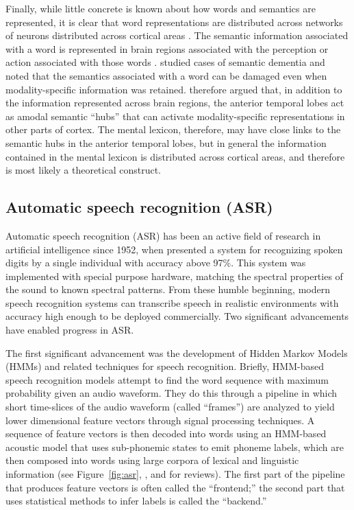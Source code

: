 Finally,
while little concrete is known
about how words and semantics
are represented,
it is clear that word representations
are distributed across networks
of neurons distributed
across cortical areas
\citep{pulvermuller2001}.
The semantic information associated
with a word is represented
in brain regions associated with
the perception or action associated
with those words
\citep{martin2007}.
\citet{patterson2007} studied
cases of semantic dementia
and noted that the semantics
associated with a word can be damaged
even when modality-specific
information was retained.
\citeauthor{patterson2007} therefore
argued that,
in addition to the information
represented across brain regions,
the anterior temporal lobes
act as amodal semantic ``hubs''
that can activate modality-specific
representations in other parts of cortex.
The mental lexicon, therefore,
may have close links to
the semantic hubs in
the anterior temporal lobes,
but in general
the information contained in the mental lexicon
is distributed across cortical areas,
and therefore
is most likely a theoretical construct.

\subsection{Automatic speech recognition (ASR)}

Automatic speech recognition (ASR) has been
an active field of research
in artificial intelligence since 1952,
when \citet{davis1952}
presented a system for recognizing
spoken digits by a single individual
with accuracy above 97\%.
This system was implemented
with special purpose hardware,
matching the spectral properties of
the sound to known spectral patterns.
From these humble beginning,
modern speech recognition systems
can transcribe speech
in realistic environments
with accuracy high enough
to be deployed commercially.
Two significant advancements
have enabled progress in ASR.

The first significant advancement
was the development of
Hidden Markov Models (HMMs)
and related techniques
for speech recognition.
Briefly,
HMM-based speech recognition models
attempt to find the word sequence
with maximum probability given
an audio waveform.
They do this through
a pipeline in which
short time-slices of the audio waveform
(called ``frames'')
are analyzed to yield lower dimensional
feature vectors
through signal processing techniques.
A sequence of feature vectors
is then decoded into words
using an HMM-based acoustic model
that uses sub-phonemic states
to emit phoneme labels,
which are then composed into words
using large corpora of
lexical and linguistic information
(see Figure~\ref{fig:asr},
\citet{bahl1983}, and
\cite{rabiner1989,gales2008} for reviews).
The first part of the pipeline
that produces feature vectors
is often called the ``frontend;''
the second part that uses
statistical methods to infer labels
is called the ``backend.''

